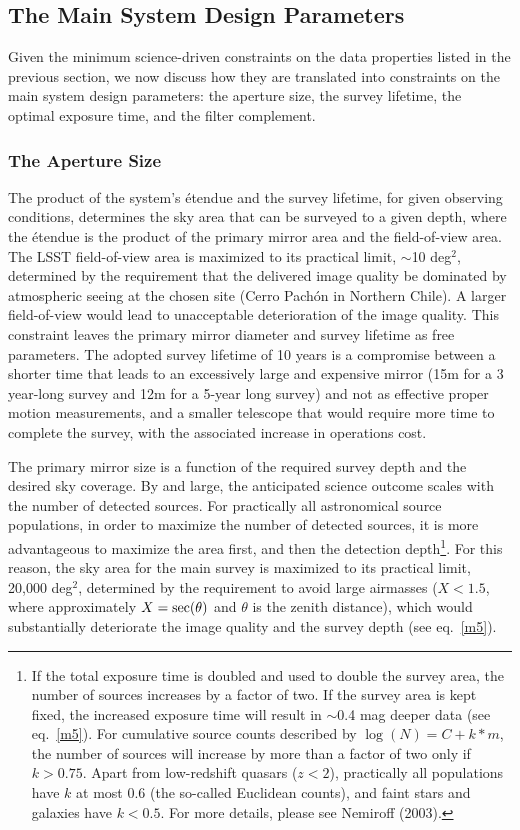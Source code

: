 \documentclass{emulateapj}
\begin{document}
\subsection{The Main System Design Parameters} 

Given the minimum science-driven constraints on the data properties listed 
in the previous section, we now discuss how they are translated into
constraints on the main system design parameters: the aperture size, 
the survey lifetime, the optimal exposure time, and the filter complement. 


\subsubsection{ The Aperture Size }
\label{Sec:apSize}
The product of the system's \'etendue and the survey lifetime, for given
observing conditions, determines
the sky area that can be surveyed to a given depth, where the \'etendue is
the product of the primary mirror area and the field-of-view area. The 
LSST field-of-view area is maximized to its practical limit, $\sim$10 deg$^2$, 
determined by the requirement that the delivered image quality be dominated 
by atmospheric seeing at the chosen site (Cerro Pach\'{o}n in Northern Chile). 
A larger field-of-view would lead to unacceptable deterioration of the 
image quality. This constraint leaves the primary mirror diameter and survey lifetime 
as free parameters. The adopted survey lifetime of 10 years is a compromise 
between a shorter time that leads to an excessively large and expensive mirror (15m for a 
3 year-long survey and 12m for a 5-year long survey) and not as effective proper motion
measurements, and a smaller telescope that would require more time to complete the 
survey, with the associated increase in operations cost.

The primary mirror size is a function of the required survey depth and the 
desired sky coverage. By and large, the anticipated science outcome scales 
with the number of detected sources. For practically all astronomical source 
populations, in order to maximize the number of detected sources, it is more 
advantageous to maximize the area first, and then 
the detection depth\footnote{ 
If the total exposure time is doubled and used to double the survey area, 
the number of sources increases by a factor of two. If the survey 
area is kept fixed, the increased exposure time will result in 
$\sim$0.4 mag deeper data (see eq.~\ref{m5}). For cumulative source 
counts described by $\log(N) = C + k*m$, the number of sources
will increase by more than a factor of two only if $k>0.75$. 
Apart from low-redshift quasars ($z<2$), practically all populations 
have $k$ at most 0.6 (the so-called Euclidean counts), and faint stars 
and galaxies have $k<0.5$. For more details, please see Nemiroff
(2003).}. For this reason, the sky area for the main survey is 
maximized to its practical limit, 20,000 deg$^2$, determined by the 
requirement to avoid large airmasses ($X<1.5$, where approximately $X={\rm sec}(\theta)$ 
and $\theta$ is the zenith distance), which would substantially 
deteriorate the image quality and the survey depth (see eq.~\ref{m5}). 
\end{document}
